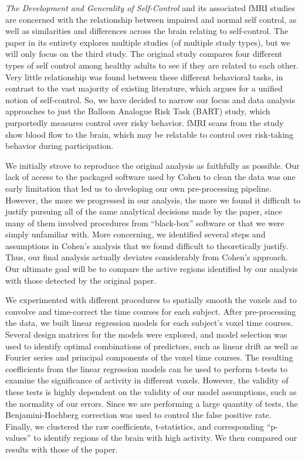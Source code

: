 \par \textit{The Development and Generality of Self-Control} \cite
{CohenSelfControl} and its associated fMRI studies are concerned with the 
relationship between impaired and normal self control, as well as 
similarities and differences across the brain relating to self-control. The 
paper in its entirety explores multiple studies (of multiple study types), 
but we will only focus on the third study. The original study compares four 
different types of self control among healthy adults to see if they are 
related to each other. Very little relationship was found between these 
different behavioral tasks, in contrast to the vast majority of existing 
literature,  which argues for a unified notion of self-control. So, we have 
decided to narrow our focus and data analysis approaches to just the Balloon 
Analogue Risk Task (BART) study, which purportedly measures control over 
risky behavior. fMRI scans from the study show blood flow to the brain, which 
may be relatable to control over risk-taking behavior during participation.

\par We initially strove to reproduce the original analysis as faithfully as 
possible. Our lack of access to the packaged software used by Cohen to clean 
the data was one early limitation that led us to developing our own 
pre-processing pipeline. However, the more we progressed in our analysis, 
the more we found it difficult to justify pursuing all of the same analytical 
decisions made by the paper, since many of them involved procedures from 
``black-box'' software or that we were simply unfamiliar with. More 
concerning, we identified several steps and assumptions in Cohen's analysis 
that we found difficult to theoretically justify. Thus, our final analysis 
actually deviates considerably from Cohen's approach. Our ultimate goal will 
be to compare the active regions identified by our analysis with those 
detected by the original paper. 

\par We experimented with different procedures to spatially smooth the voxels 
and to convolve and time-correct the time courses for each subject. After 
pre-processing the data, we built linear regression models for each subject's 
voxel time courses. Several design matrices for the models were explored, and 
model selection was used to identify optimal combinations of predictors, 
such as linear drift as well as Fourier series and principal components of the 
voxel time courses. The resulting coefficients from the linear regression 
models can be used to perform t-tests to examine the significance of activity 
in different voxels. However, the validity of these tests is highly dependent 
on the validity of our model assumptions, such as the normality of our errors. 
Since we are performing a large quantity of tests, the Benjamini-Hochberg 
correction was used to control the false positive rate. Finally, we clustered 
the raw coefficients, t-statistics, and corresponding ``p-values'' to identify 
regions of the brain with high activity. We then compared our results with 
those of the paper. 

